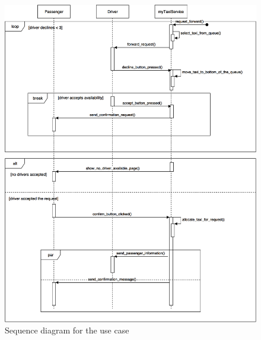 \documentclass[a4paper,12pt]{article}%
\begin{document}
\begin{figure}[H]
\centering
\includegraphics[scale=.3]{request_forward.png}
\caption{Sequence diagram for the use case}
\end{figure}
\break
\end{document}
